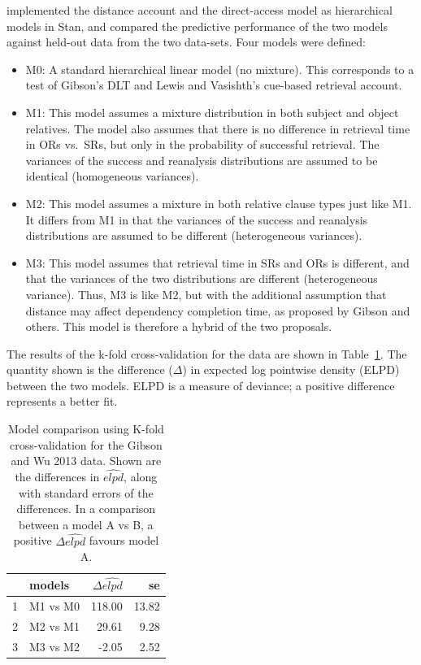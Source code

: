 \documentclass{cambridge7A}\usepackage[]{graphicx}\usepackage[]{color}
\begin{document}
\cite{VasishthChopinRyderNicenboimCogSci2017} implemented the distance account and the direct-access model as hierarchical models in  Stan, and compared the predictive performance of the two models against held-out data from the two data-sets. Four models were defined:

\begin{itemize}
\item M0: A  standard hierarchical linear model (no mixture). This corresponds to a test of Gibson's DLT and Lewis and Vasishth's cue-based retrieval account.
\item M1: This model assumes a mixture distribution in both subject and object relatives. The model also assumes
that there is no difference in retrieval time in ORs vs.\ SRs, but only in the probability of successful retrieval. The variances of the success and reanalysis distributions are assumed to be identical  (homogeneous variances). 
\item M2: This model assumes a mixture in both relative clause types just like M1. It differs from M1 in that the variances of the success and reanalysis distributions are assumed to be different  (heterogeneous variances).
\item M3: This model assumes that retrieval time in SRs and ORs is different, and that the variances of the two distributions are different (heterogeneous variance). Thus, M3 is like M2, but with the additional assumption that distance may affect dependency completion time, as proposed by Gibson and others. This model is therefore a hybrid of the two proposals.
\end{itemize}

The results of the k-fold cross-validation for the \cite{gibsonwu} data are shown in Table~\ref{tab:modcompgibsonwu}. The quantity shown is the difference ($\Delta$) in expected log pointwise density (ELPD) between the two models. ELPD is  a measure of deviance; a positive  difference represents a better fit.

\begin{table}[!htbp]
\centering
\begin{tabular}{rlrr}
  \hline
 & models & $\Delta \widehat{elpd}$ & se \\ 
  \hline
1 & M1 vs M0 & 118.00 & 13.82 \\ 
  2 & M2 vs M1 & 29.61 & 9.28 \\ 
  3 & M3 vs M2 & -2.05 & 2.52 \\ 
   \hline
\end{tabular}
\caption{Model comparison using K-fold cross-validation for the Gibson and Wu 2013 data. Shown are the differences in $\widehat{elpd}$, along with standard errors of the differences. In a comparison between a model A vs B, a positive $\Delta\widehat{elpd}$ favours model A.} 
\label{tab:modcompgibsonwu}
\end{table}
\end{document}
